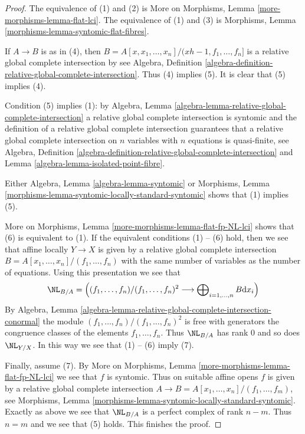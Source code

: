 \begin{proof}
The equivalence of (1) and (2) is
More on Morphisms, Lemma \ref{more-morphisms-lemma-flat-lci}.
The equivalence of (1) and (3) is 
Morphisms, Lemma \ref{morphisms-lemma-syntomic-flat-fibres}.

\medskip\noindent
If $A \to B$ is as in (4), then
$B = A[x, x_1, \ldots, x_n]/(xh - 1, f_1, \ldots, f_n]$
is a relative global complete intersection by see Algebra, Definition
\ref{algebra-definition-relative-global-complete-intersection}.
Thus (4) implies (5).
It is clear that (5) implies (4).

\medskip\noindent
Condition (5) implies (1): by
Algebra, Lemma \ref{algebra-lemma-relative-global-complete-intersection}
a relative global complete intersection is syntomic and
the definition of a relative global complete intersection
guarantees that a relative global complete intersection on
$n$ variables with $n$ equations is quasi-finite, see
Algebra, Definition
\ref{algebra-definition-relative-global-complete-intersection} and
Lemma \ref{algebra-lemma-isolated-point-fibre}.

\medskip\noindent
Either Algebra, Lemma \ref{algebra-lemma-syntomic} or
Morphisms, Lemma \ref{morphisms-lemma-syntomic-locally-standard-syntomic}
shows that (1) implies (5).

\medskip\noindent
More on Morphisms, Lemma \ref{more-morphisms-lemma-flat-fp-NL-lci} shows that
(6) is equivalent to (1). If the equivalent conditions (1) -- (6) hold,
then we see that affine locally $Y \to X$ is given by a relative global
complete intersection $B = A[x_1, \ldots, x_n]/(f_1, \ldots, f_n)$
with the same number of variables as the number of
equations. Using this presentation we see that
$$
\NL_{B/A} =\left(
(f_1, \ldots, f_n)/(f_1, \ldots, f_n)^2
\longrightarrow
\bigoplus\nolimits_{i = 1, \ldots, n} B \text{d} x_i\right)
$$
By Algebra, Lemma
\ref{algebra-lemma-relative-global-complete-intersection-conormal}
the module $(f_1, \ldots, f_n)/(f_1, \ldots, f_n)^2$
is free with generators the congruence classes of the elements
$f_1, \ldots, f_n$. Thus $\NL_{B/A}$ has rank $0$ and so does $\NL_{Y/X}$.
In this way we see that (1) -- (6) imply (7).

\medskip\noindent
Finally, assume (7). By
More on Morphisms, Lemma \ref{more-morphisms-lemma-flat-fp-NL-lci}
we see that $f$ is syntomic. Thus on suitable affine opens
$f$ is given by a relative global complete intersection
$A \to B = A[x_1, \ldots, x_n]/(f_1, \ldots, f_m)$, see
Morphisms, Lemma \ref{morphisms-lemma-syntomic-locally-standard-syntomic}.
Exactly as above we see that $\NL_{B/A}$ is a perfect complex
of rank $n - m$. Thus $n = m$ and we see that (5) holds.
This finishes the proof.
\end{proof}

